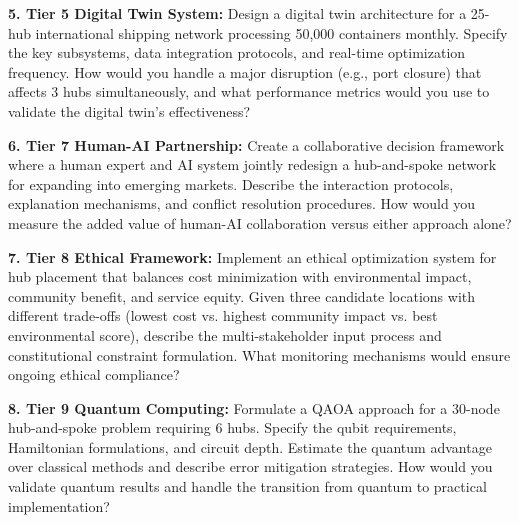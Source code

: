 \documentclass{article}
\begin{document}
\textbf{5. Tier 5 Digital Twin System:}
Design a digital twin architecture for a 25-hub international shipping network processing 50,000 containers monthly. Specify the key subsystems, data integration protocols, and real-time optimization frequency. How would you handle a major disruption (e.g., port closure) that affects 3 hubs simultaneously, and what performance metrics would you use to validate the digital twin's effectiveness?

\textbf{6. Tier 7 Human-AI Partnership:}
Create a collaborative decision framework where a human expert and AI system jointly redesign a hub-and-spoke network for expanding into emerging markets. Describe the interaction protocols, explanation mechanisms, and conflict resolution procedures. How would you measure the added value of human-AI collaboration versus either approach alone?

\textbf{7. Tier 8 Ethical Framework:}
Implement an ethical optimization system for hub placement that balances cost minimization with environmental impact, community benefit, and service equity. Given three candidate locations with different trade-offs (lowest cost vs. highest community impact vs. best environmental score), describe the multi-stakeholder input process and constitutional constraint formulation. What monitoring mechanisms would ensure ongoing ethical compliance?

\textbf{8. Tier 9 Quantum Computing:}
Formulate a QAOA approach for a 30-node hub-and-spoke problem requiring 6 hubs. Specify the qubit requirements, Hamiltonian formulations, and circuit depth. Estimate the quantum advantage over classical methods and describe error mitigation strategies. How would you validate quantum results and handle the transition from quantum to practical implementation?
\end{document}
